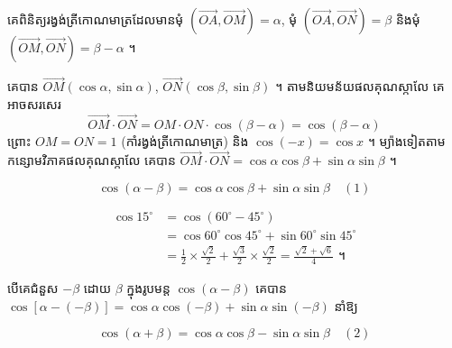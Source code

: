 គេពិនិត្យរង្វង់ត្រីកោណមាត្រដែលមានមុំ $(\overrightarrow{OA}, \overrightarrow{OM}) = \alpha$, មុំ $(\overrightarrow{OA}, \overrightarrow{ON}) = \beta$ និងមុំ $(\overrightarrow{OM}, \overrightarrow{ON}) = \beta - \alpha$ ។
\begin{center}
\end{center}
គេបាន $\overrightarrow{OM}(\cos\alpha, \sin\alpha)$, $\overrightarrow{ON}(\cos\beta, \sin\beta)$ ។ តាមនិយមន័យផលគុណស្កាលែ គេអាចសរសេរ
\[ \overrightarrow{OM} \cdot \overrightarrow{ON} = OM \cdot ON \cdot \cos(\beta - \alpha) = \cos(\beta - \alpha) \]
ព្រោះ $OM = ON = 1$ (កាំរង្វង់ត្រីកោណមាត្រ) និង $\cos(-x) = \cos x$ ។ ម្យ៉ាងទៀតតាមកន្សោមវិភាគផលគុណស្កាលែ គេបាន $\overrightarrow{OM} \cdot \overrightarrow{ON} = \cos\alpha\cos\beta + \sin\alpha\sin\beta$ ។
\begin{formulaBox}[ដូច្នេះ]
\[ \cos(\alpha - \beta) = \cos\alpha\cos\beta + \sin\alpha\sin\beta \quad (1) \]
\end{formulaBox}

\begin{example}[ឧទាហរណ៍ ២]
\[
\begin{aligned}
\cos 15^\circ &= \cos(60^\circ - 45^\circ)\\
&= \cos 60^\circ\cos 45^\circ + \sin 60^\circ\sin 45^\circ\\
&= \frac{1}{2} \times \frac{\sqrt{2}}{2} + \frac{\sqrt{3}}{2} \times \frac{\sqrt{2}}{2} = \frac{\sqrt{2} + \sqrt{6}}{4} \text{ ។}
\end{aligned}
\]
\end{example}

បើគេជំនួស $-\beta$ ដោយ $\beta$ ក្នុងរូបមន្ត $\cos(\alpha - \beta)$ គេបាន $\cos[\alpha - (-\beta)] = \cos\alpha\cos(-\beta) + \sin\alpha\sin(-\beta)$ នាំឱ្យ
\begin{formulaBox}[រូបមន្ត]
\[ \cos(\alpha + \beta) = \cos\alpha\cos\beta - \sin\alpha\sin\beta \quad (2) \]
\end{formulaBox}

